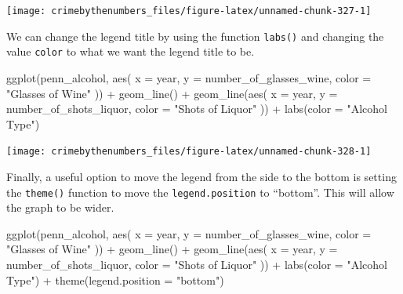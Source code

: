 \documentclass[
  a4paper,
]{krantz}
\makeatletter
\newenvironment{Shaded}{\begin{snugshade}}{\end{snugshade}}
\newcommand{\AttributeTok}[1]{\textcolor[rgb]{0.61,0.61,0.61}{#1}}
\newcommand{\FunctionTok}[1]{\textcolor[rgb]{0,0,0}{#1}}
\newcommand{\NormalTok}[1]{#1}
\newcommand{\SpecialCharTok}[1]{\textcolor[rgb]{0,0,0}{#1}}
\newcommand{\StringTok}[1]{\textcolor[rgb]{0.5,0.5,0.5}{#1}}
\newenvironment{kframe}{%
\medskip{}
\setlength{\fboxsep}{.8em}
 \def\at@end@of@kframe{}%
 \ifinner\ifhmode%
  \def\at@end@of@kframe{\end{minipage}}%
  \begin{minipage}{\columnwidth}%
 \fi\fi%
 \def\FrameCommand##1{\hskip\@totalleftmargin \hskip-\fboxsep
 \colorbox{shadecolor}{##1}\hskip-\fboxsep
     \hskip-\linewidth \hskip-\@totalleftmargin \hskip\columnwidth}%
 \MakeFramed {\advance\hsize-\width
   \@totalleftmargin\z@ \linewidth\hsize
   \@setminipage}}%
 {\par\unskip\endMakeFramed%
 \at@end@of@kframe}
\renewenvironment{Shaded}{\begin{kframe}}{\end{kframe}}
\makeatother
\begin{document}
\begin{center}\texttt{[image: crimebythenumbers\_files/figure-latex/unnamed-chunk-327-1]} \end{center}

We can change the legend title by using the function
\texttt{labs()} and changing the value \texttt{color} to
what we want the legend title to be.

\begin{Shaded}
\begin{Highlighting}[]
\FunctionTok{ggplot}\NormalTok{(penn\_alcohol, }\FunctionTok{aes}\NormalTok{(}
  \AttributeTok{x =}\NormalTok{ year,}
  \AttributeTok{y =}\NormalTok{ number\_of\_glasses\_wine,}
  \AttributeTok{color =} \StringTok{"Glasses of Wine"}
\NormalTok{)) }\SpecialCharTok{+}
  \FunctionTok{geom\_line}\NormalTok{() }\SpecialCharTok{+}
  \FunctionTok{geom\_line}\NormalTok{(}\FunctionTok{aes}\NormalTok{(}
    \AttributeTok{x =}\NormalTok{ year,}
    \AttributeTok{y =}\NormalTok{ number\_of\_shots\_liquor,}
    \AttributeTok{color =} \StringTok{"Shots of Liquor"}
\NormalTok{  )) }\SpecialCharTok{+}
  \FunctionTok{labs}\NormalTok{(}\AttributeTok{color =} \StringTok{"Alcohol Type"}\NormalTok{)}
\end{Highlighting}
\end{Shaded}

\begin{center}\texttt{[image: crimebythenumbers\_files/figure-latex/unnamed-chunk-328-1]} \end{center}

Finally, a useful option to move the legend from the side to
the bottom is setting the \texttt{theme()} function to move
the \texttt{legend.position} to ``bottom''. This will allow
the graph to be wider.

\begin{Shaded}
\begin{Highlighting}[]
\FunctionTok{ggplot}\NormalTok{(penn\_alcohol, }\FunctionTok{aes}\NormalTok{(}
  \AttributeTok{x =}\NormalTok{ year,}
  \AttributeTok{y =}\NormalTok{ number\_of\_glasses\_wine,}
  \AttributeTok{color =} \StringTok{"Glasses of Wine"}
\NormalTok{)) }\SpecialCharTok{+}
  \FunctionTok{geom\_line}\NormalTok{() }\SpecialCharTok{+}
  \FunctionTok{geom\_line}\NormalTok{(}\FunctionTok{aes}\NormalTok{(}
    \AttributeTok{x =}\NormalTok{ year,}
    \AttributeTok{y =}\NormalTok{ number\_of\_shots\_liquor,}
    \AttributeTok{color =} \StringTok{"Shots of Liquor"}
\NormalTok{  )) }\SpecialCharTok{+}
  \FunctionTok{labs}\NormalTok{(}\AttributeTok{color =} \StringTok{"Alcohol Type"}\NormalTok{) }\SpecialCharTok{+}
  \FunctionTok{theme}\NormalTok{(}\AttributeTok{legend.position =} \StringTok{"bottom"}\NormalTok{)}
\end{Highlighting}
\end{Shaded}
\end{document}
